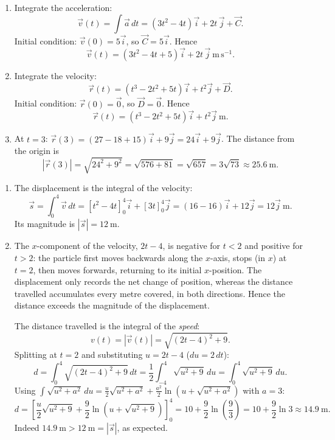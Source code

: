 \documentclass[11pt]{article}
\begin{document}
\begin{corrige}
\begin{enumerate}
\item Integrate the acceleration:
\[ \vec{v}(t) = \int \vec{a}\,dt = \left(3t^2 - 4t\right)\vec{i} + 2t\,\vec{j} + \vec{C}. \]
Initial condition: $\vec{v}(0) = 5\vec{i}$, so $\vec{C} = 5\vec{i}$. Hence
\[ \vec{v}(t) = (3t^2 - 4t + 5)\vec{i} + 2t\,\vec{j}\ \mathrm{m\,s^{-1}}. \]
\item Integrate the velocity:
\[ \vec{r}(t) = \left(t^3 - 2t^2 + 5t\right)\vec{i} + t^2\vec{j} + \vec{D}. \]
Initial condition: $\vec{r}(0) = \vec{0}$, so $\vec{D} = \vec{0}$. Hence
\[ \vec{r}(t) = (t^3 - 2t^2 + 5t)\vec{i} + t^2\vec{j}\ \mathrm{m}. \]
\item At $t = 3$: $\vec{r}(3) = (27 - 18 + 15)\vec{i} + 9\vec{j} = 24\vec{i} + 9\vec{j}$. The distance from the origin is
\[ |\vec{r}(3)| = \sqrt{24^2 + 9^2} = \sqrt{576 + 81} = \sqrt{657} = 3\sqrt{73} \approx 25.6\ \mathrm{m}. \]
\end{enumerate}
\end{corrige}

\begin{corrige}
\begin{enumerate}
\item The displacement is the integral of the velocity:
\[ \vec{s} = \int_0^4 \vec{v}\,dt = \left[t^2 - 4t\right]_0^4 \vec{i} + \left[3t\right]_0^4 \vec{j} = (16 - 16)\vec{i} + 12\vec{j} = 12\vec{j}\ \mathrm{m}. \]
Its magnitude is $|\vec{s}| = 12\ \mathrm{m}$.
\item The $x$-component of the velocity, $2t - 4$, is negative for $t < 2$ and positive for $t > 2$: the particle first moves backwards along the $x$-axis, stops (in $x$) at $t = 2$, then moves forwards, returning to its initial $x$-position. The displacement only records the net change of position, whereas the distance travelled accumulates every metre covered, in both directions. Hence the distance exceeds the magnitude of the displacement.

The distance travelled is the integral of the \emph{speed}:
\[ v(t) = |\vec{v}(t)| = \sqrt{(2t-4)^2 + 9}. \]
Splitting at $t = 2$ and substituting $u = 2t - 4$ ($du = 2\,dt$):
\[ d = \int_0^4 \sqrt{(2t-4)^2 + 9}\,dt = \frac{1}{2}\int_{-4}^{4} \sqrt{u^2 + 9}\,du = \int_0^4 \sqrt{u^2 + 9}\,du. \]
Using $\displaystyle\int \sqrt{u^2 + a^2}\,du = \frac{u}{2}\sqrt{u^2 + a^2} + \frac{a^2}{2}\ln\left(u + \sqrt{u^2 + a^2}\right)$ with $a = 3$:
\[ d = \left[\frac{u}{2}\sqrt{u^2 + 9} + \frac{9}{2}\ln\left(u + \sqrt{u^2 + 9}\right)\right]_0^4 = 10 + \frac{9}{2}\ln\left(\frac{9}{3}\right) = 10 + \frac{9}{2}\ln 3 \approx 14.9\ \mathrm{m}. \]
Indeed $14.9\ \mathrm{m} > 12\ \mathrm{m} = |\vec{s}|$, as expected.
\end{enumerate}
\end{corrige}
\end{document}
